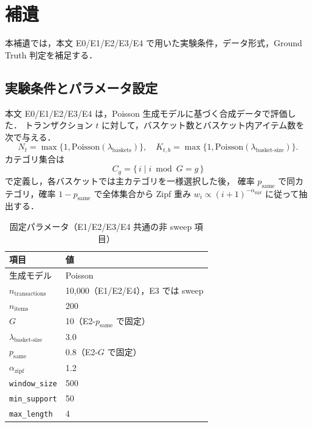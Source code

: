 \section{補遺}
\label{sec:supplement}

本補遺では，本文 E0/E1/E2/E3/E4 で用いた実験条件，データ形式，Ground Truth 判定を補足する．

\subsection{実験条件とパラメータ設定}
\label{sec:supp_exp_conditions}

本文 E0/E1/E2/E3/E4 は，Poisson 生成モデルに基づく合成データで評価した．
トランザクション $t$ に対して，バスケット数とバスケット内アイテム数を
次で与える．
\[
N_t = \max\{1, \mathrm{Poisson}(\lambda_{\text{baskets}})\},
\quad
K_{t,b} = \max\{1, \mathrm{Poisson}(\lambda_{\text{basket-size}})\}.
\]
カテゴリ集合は
\[
C_g = \{\,i \mid i \bmod G = g\,\}
\]
で定義し，各バスケットでは主カテゴリを一様選択した後，
確率 $p_{\text{same}}$ で同カテゴリ，確率 $1-p_{\text{same}}$ で全体集合から
Zipf 重み $w_i \propto (i+1)^{-\alpha_{\text{zipf}}}$ に従って抽出する．

\begin{table}[t]
\caption{固定パラメータ（E1/E2/E3/E4 共通の非 sweep 項目）}
\label{tab:supp_fixed_params}
\centering
\begin{tabular}{ll}
\toprule
項目 & 値 \\
\midrule
生成モデル & Poisson \\
$n_{\text{transactions}}$ & 10,000（E1/E2/E4），E3 では sweep \\
$n_{\text{items}}$ & 200 \\
$G$ & 10（E2-$p_{\text{same}}$ で固定） \\
$\lambda_{\text{basket-size}}$ & 3.0 \\
$p_{\text{same}}$ & 0.8（E2-$G$ で固定） \\
$\alpha_{\text{zipf}}$ & 1.2 \\
\texttt{window\_size} & 500 \\
\texttt{min\_support} & 50 \\
\texttt{max\_length} & 4 \\
\bottomrule
\end{tabular}
\end{table}

